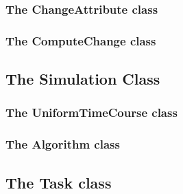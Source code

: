   \subsubsection[ChangeAttribute]{The ChangeAttribute class}
  

  \subsubsection[ComputeChange]{The ComputeChange class}
  


 \subsection[Simulation]{The Simulation Class}
 

 \subsubsection[UniformTimeCourse]{The UniformTimeCourse class}
 

 \subsubsection[Algorithm]{The Algorithm class}
 


%

%

 \newpage
 \subsection[Task]{The Task class}
 

